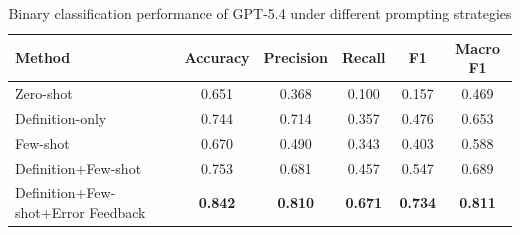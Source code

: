 \begin{table}[t]
\centering
\caption{Binary classification performance of GPT-5.4 under different prompting strategies}
\label{tab:gpt54_prompting_strategies}
\begin{tabular}{lccccc}
\hline
Method & Accuracy & Precision & Recall & F1 & Macro F1 \\
\hline
Zero-shot & 0.651 & 0.368 & 0.100 & 0.157 & 0.469 \\
Definition-only & 0.744 & 0.714 & 0.357 & 0.476 & 0.653 \\
Few-shot & 0.670 & 0.490 & 0.343 & 0.403 & 0.588 \\
Definition+Few-shot & 0.753 & 0.681 & 0.457 & 0.547 & 0.689\\
Definition+Few-shot+Error Feedback & \textbf{0.842} & \textbf{0.810} & \textbf{0.671} & \textbf{0.734} & \textbf{0.811} \\
\hline
\end{tabular}
\end{table}
